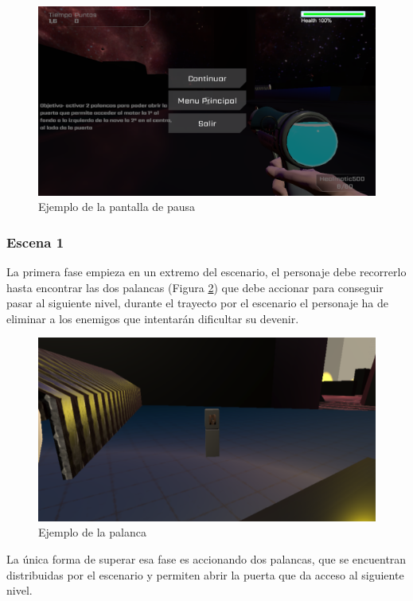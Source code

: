 \begin{figure}[H]
	\centering
	\includegraphics[scale=0.45]{imagenes/MenuPausa.png}
	\caption{\label{fig:MenuPausa}Ejemplo de la pantalla de pausa}
\end{figure}

\subsubsection{Escena 1}
La primera fase empieza en un extremo del escenario, el personaje debe recorrerlo hasta encontrar las dos palancas (Figura \ref{fig:Palanca}) que debe accionar para conseguir pasar al siguiente nivel, durante el trayecto por el escenario el personaje ha de eliminar a los enemigos que intentarán dificultar su devenir.

\begin{figure}[H]
	\centering
	\includegraphics[scale=0.75]{imagenes/Palanca.png}
	\caption{\label{fig:Palanca}Ejemplo de la palanca}
\end{figure}

La única forma de superar esa fase es accionando dos palancas, que se encuentran distribuidas por el escenario y permiten abrir la puerta que da acceso al siguiente nivel.

